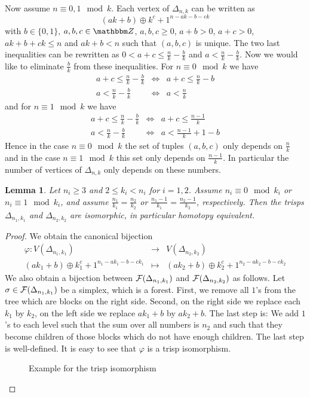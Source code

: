 \documentclass{elsarticle}
\newtheorem{lem}[df]{Lemma}
\def\Z{\mathbbm Z}
\begin{document}
Now assume $n\equiv 0,1\mod k$. Each vertex of $\Delta_{n,k}$ can be written as
\[(ak+b)\oplus k^c+1^{n-ak-b-ck}\]
with $b\in\{0,1\}$, $a,b,c\in\Z$, $a,b,c\geq 0$, $a+b>0$, $a+c>0$, $ak+b+ck\leq n$ and $ak+b<n$ such that $(a,b,c)$ is unique. The two last inequalities can be rewritten as $0<a+c\leq\frac nk-\frac bk$ and $a<\frac nk-\frac bk$. Now we would like to eliminate $\frac bk$ from these inequalities. For $n\equiv 0\mod k$ we have
\begin{eqnarray*}
a+c\leq\frac nk-\frac bk&\Leftrightarrow&a+c\leq\frac nk-b\\
a<\frac nk-\frac bk&\Leftrightarrow&a<\frac nk
\end{eqnarray*}
and for $n\equiv 1\mod k$ we have
\begin{eqnarray*}
a+c\leq\frac nk-\frac bk&\Leftrightarrow&a+c\leq\frac {n-1}k\\
a<\frac nk-\frac bk&\Leftrightarrow&a<\frac {n-1}k+1-b
\end{eqnarray*}
Hence in the case $n\equiv 0\mod k$ the set of tuples $(a,b,c)$ only depends on $\frac nk$ and in the case $n\equiv 1\mod k$ this set only depends on $\frac {n-1}k$. In particular the number of vertices of $\Delta_{n,k}$ only depends on these numbers.
\begin{lem}
\label{trispiso}
Let $n_i\geq3$ and $2\leq k_i<n_i$ for $i=1,2$. Assume $n_i\equiv 0\mod k_i$ or $n_i\equiv 1\mod k_i$, and assume $\frac{n_1}{k_1}=\frac{n_2}{k_2}$ or $\frac{n_1-1}{k_1}=\frac{n_2-1}{k_2}$, respectively. Then the trisps $\Delta_{n_1,k_1}$ and $\Delta_{n_2,k_2}$ are isomorphic, in particular homotopy equivalent.
\end{lem}
\begin{proof}
We obtain the canonical bijection
\begin{eqnarray*}
\varphi:V(\Delta_{n_1,k_1})&\longrightarrow&V(\Delta_{n_2,k_2})\\
(ak_1+b)\oplus k_1^c+1^{n_1-ak_1-b-ck_1}&\longmapsto&(ak_2+b)\oplus k_2^c+1^{n_2-ak_2-b-ck_2}
\end{eqnarray*}
We also obtain a bijection between ${\cal F}(\Delta_{n_1,k_1})$ and ${\cal F}(\Delta_{n_2,k_2})$ as follows. Let $\sigma\in{\cal F}(\Delta_{n_1,k_1})$ be a simplex, which is a forest. First, we remove all $1$'s from the tree which are blocks on the right side. Second, on the right side we replace each $k_1$ by $k_2$, on the left side we replace $ak_1+b$ by $ak_2+b$. The last step is: We add $1$'s to each level such that the sum over all numbers is $n_2$ and such that they become children of those blocks which do not have enough children. The last step is well-defined. It is easy to see that $\varphi$ is a trisp isomorphism.
\begin{figure}[ht]
\centering
 
\caption{Example for the trisp isomorphism}
\end{figure}
\end{proof}
\end{document}
